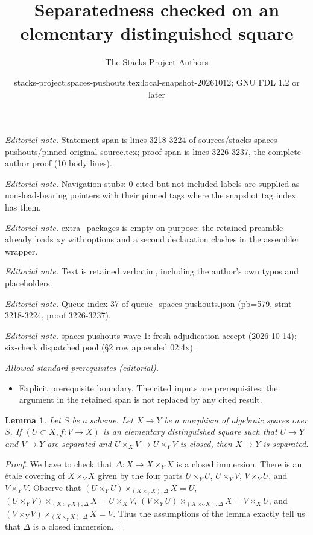 \documentclass[10pt,a4paper]{amsart}
\title{Separatedness checked on an elementary distinguished square}
\author{The Stacks Project Authors}
\date{stacks-project:spaces-pushouts.tex:local-snapshot-20261012; GNU FDL 1.2 or later}
\theoremstyle{plain}
\newtheorem{lemma}[subsection]{Lemma}
\theoremstyle{definition}
\theoremstyle{remark}
\numberwithin{equation}{subsection}
\begin{document}
\maketitle
\noindent\textit{Editorial note.} Statement span is lines 3218-3224 of sources/stacks-spaces-pushouts/pinned-original-source.tex; proof span is lines 3226-3237, the complete author proof (10 body lines).\par\medskip
\noindent\textit{Editorial note.} Navigation stubs: 0 cited-but-not-included labels are supplied as non-load-bearing pointers with their pinned tags where the snapshot tag index has them.\par\medskip
\noindent\textit{Editorial note.} extra\_packages is empty on purpose: the retained preamble already loads xy with options and a second declaration clashes in the assembler wrapper.\par\medskip
\noindent\textit{Editorial note.} Text is retained verbatim, including the author's own typos and placeholders.\par\medskip
\noindent\textit{Editorial note.} Queue index 37 of queue\_spaces-pushouts.json (pb=579, stmt 3218-3224, proof 3226-3237).\par\medskip
\noindent\textit{Editorial note.} spaces-pushouts wave-1: fresh adjudication accept (2026-10-14); six-check dispatched pool (§2 row appended 02:4x).\par\medskip
\noindent\textit{Allowed standard prerequisites (editorial).}\begin{itemize}
\item Explicit prerequisite boundary. The cited inputs are prerequisites; the argument in the retained span is not replaced by any cited result.
\end{itemize}\medskip
\begin{lemma}
\label{lemma-check-separated}
Let $S$ be a scheme. Let $X \to Y$ be a morphism of algebraic spaces over $S$.
If $(U \subset X, f : V \to X)$ is an elementary distinguished square
such that $U \to Y$ and $V \to Y$ are separated and
$U \times_X V \to U \times_Y V$ is closed, then $X \to Y$ is separated.
\end{lemma}

\begin{proof}
We have to check that $\Delta : X \to X \times_Y X$ is a closed immersion.
There is an \'etale covering of $X \times_Y X$ given by the four parts
$U \times_Y U$, $U \times_Y V$, $V \times_Y U$, and $V \times_Y V$.
Observe that
$(U \times_Y U) \times_{(X \times_Y X), \Delta} X  = U$,
$(U \times_Y V) \times_{(X \times_Y X), \Delta} X = U \times_X V$,
$(V \times_Y U) \times_{(X \times_Y X), \Delta} X = V \times_X U$, and
$(V \times_Y V) \times_{(X \times_Y X), \Delta} X = V$.
Thus the assumptions of the lemma
exactly tell us that $\Delta$ is a closed immersion.
\end{proof}
\end{document}
